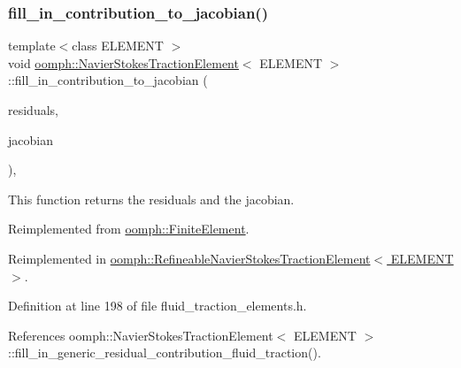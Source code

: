 \subsubsection{\texorpdfstring{fill\+\_\+in\+\_\+contribution\+\_\+to\+\_\+jacobian()}{fill\_in\_contribution\_to\_jacobian()}}
{\footnotesize\ttfamily template$<$class E\+L\+E\+M\+E\+NT $>$ \\
void \hyperlink{classoomph_1_1NavierStokesTractionElement}{oomph\+::\+Navier\+Stokes\+Traction\+Element}$<$ E\+L\+E\+M\+E\+NT $>$\+::fill\+\_\+in\+\_\+contribution\+\_\+to\+\_\+jacobian (\begin{DoxyParamCaption}\item[{\hyperlink{classoomph_1_1Vector}{Vector}$<$ double $>$ \&}]{residuals,  }\item[{\hyperlink{classoomph_1_1DenseMatrix}{Dense\+Matrix}$<$ double $>$ \&}]{jacobian }\end{DoxyParamCaption})\hspace{0.3cm}{\ttfamily [inline]}, {\ttfamily [virtual]}}



This function returns the residuals and the jacobian. 



Reimplemented from \hyperlink{classoomph_1_1FiniteElement_a0ae7af222af38a0d53bf283dc85bdfea}{oomph\+::\+Finite\+Element}.



Reimplemented in \hyperlink{classoomph_1_1RefineableNavierStokesTractionElement_a67eea13f9a419e35576b6183f0438bab}{oomph\+::\+Refineable\+Navier\+Stokes\+Traction\+Element$<$ E\+L\+E\+M\+E\+N\+T $>$}.



Definition at line 198 of file fluid\+\_\+traction\+\_\+elements.\+h.



References oomph\+::\+Navier\+Stokes\+Traction\+Element$<$ E\+L\+E\+M\+E\+N\+T $>$\+::fill\+\_\+in\+\_\+generic\+\_\+residual\+\_\+contribution\+\_\+fluid\+\_\+traction().

\mbox{\label{classoomph_1_1NavierStokesTractionElement_a049940e46f7aba913cf05f95c31061f3}} 
